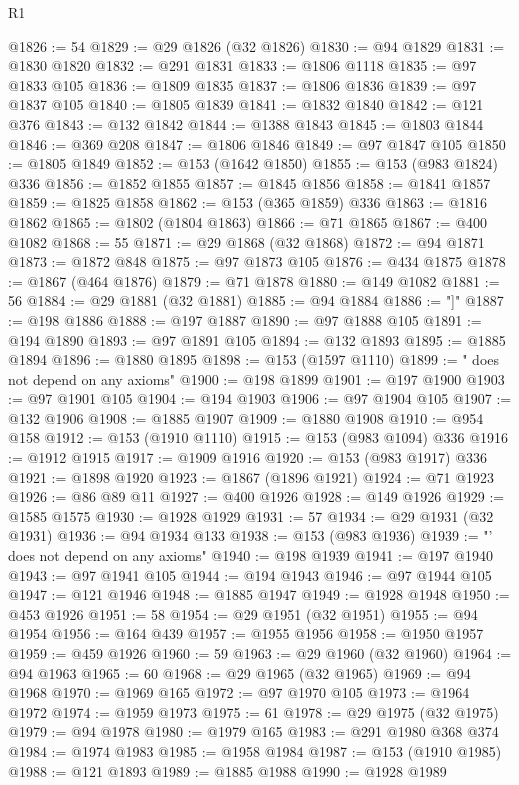 \begin{lexlean}{R1}
\begin{coremodule}
{{{{{{{{{{{{{{{{{{{{{{{{{{{{{{{{{{{{{{{{{{{{{{{{{{{{{{{{{{{{{{{{{{{{{{{{{{{{{{{{{{{{{{{{{{{{{{{{{{{{{{{{{{{{{{{{{{{{{{{{{{{{{{{{{{{{{{{{{{{{{{{{{{{{{{{{{{{{{{{{{{{{{{{{{{{{{{{{{{{{{{{{{{@1826 := 54
@1829 := @29 @1826 (@32 @1826)
@1830 := @94 @1829
@1831 := @1830 @1820
@1832 := @291 @1831
@1833 := @1806 @1118
@1835 := @97 @1833 @105
@1836 := @1809 @1835
@1837 := @1806 @1836
@1839 := @97 @1837 @105
@1840 := @1805 @1839
@1841 := @1832 @1840
@1842 := @121 @376
@1843 := @132 @1842
@1844 := @1388 @1843
@1845 := @1803 @1844
@1846 := @369 @208
@1847 := @1806 @1846
@1849 := @97 @1847 @105
@1850 := @1805 @1849
@1852 := @153 (@1642 @1850)
@1855 := @153 (@983 @1824) @336
@1856 := @1852 @1855
@1857 := @1845 @1856
@1858 := @1841 @1857
@1859 := @1825 @1858
@1862 := @153 (@365 @1859) @336
@1863 := @1816 @1862
@1865 := @1802 (@1804 @1863)
@1866 := @71 @1865
@1867 := @400 @1082
@1868 := 55
@1871 := @29 @1868 (@32 @1868)
@1872 := @94 @1871
@1873 := @1872 @848
@1875 := @97 @1873 @105
@1876 := @434 @1875
@1878 := @1867 (@464 @1876)
@1879 := @71 @1878
@1880 := @149 @1082
@1881 := 56
@1884 := @29 @1881 (@32 @1881)
@1885 := @94 @1884
@1886 := "]"
@1887 := @198 @1886
@1888 := @197 @1887
@1890 := @97 @1888 @105
@1891 := @194 @1890
@1893 := @97 @1891 @105
@1894 := @132 @1893
@1895 := @1885 @1894
@1896 := @1880 @1895
@1898 := @153 (@1597 @1110)
@1899 := " does not depend on any axioms"
@1900 := @198 @1899
@1901 := @197 @1900
@1903 := @97 @1901 @105
@1904 := @194 @1903
@1906 := @97 @1904 @105
@1907 := @132 @1906
@1908 := @1885 @1907
@1909 := @1880 @1908
@1910 := @954 @158
@1912 := @153 (@1910 @1110)
@1915 := @153 (@983 @1094) @336
@1916 := @1912 @1915
@1917 := @1909 @1916
@1920 := @153 (@983 @1917) @336
@1921 := @1898 @1920
@1923 := @1867 (@1896 @1921)
@1924 := @71 @1923
@1926 := @86 @89 @11
@1927 := @400 @1926
@1928 := @149 @1926
@1929 := @1585 @1575
@1930 := @1928 @1929
@1931 := 57
@1934 := @29 @1931 (@32 @1931)
@1936 := @94 @1934 @133
@1938 := @153 (@983 @1936)
@1939 := "' does not depend on any axioms"
@1940 := @198 @1939
@1941 := @197 @1940
@1943 := @97 @1941 @105
@1944 := @194 @1943
@1946 := @97 @1944 @105
@1947 := @121 @1946
@1948 := @1885 @1947
@1949 := @1928 @1948
@1950 := @453 @1926
@1951 := 58
@1954 := @29 @1951 (@32 @1951)
@1955 := @94 @1954
@1956 := @164 @439
@1957 := @1955 @1956
@1958 := @1950 @1957
@1959 := @459 @1926
@1960 := 59
@1963 := @29 @1960 (@32 @1960)
@1964 := @94 @1963
@1965 := 60
@1968 := @29 @1965 (@32 @1965)
@1969 := @94 @1968
@1970 := @1969 @165
@1972 := @97 @1970 @105
@1973 := @1964 @1972
@1974 := @1959 @1973
@1975 := 61
@1978 := @29 @1975 (@32 @1975)
@1979 := @94 @1978
@1980 := @1979 @165
@1983 := @291 @1980 @368 @374
@1984 := @1974 @1983
@1985 := @1958 @1984
@1987 := @153 (@1910 @1985)
@1988 := @121 @1893
@1989 := @1885 @1988
@1990 := @1928 @1989
}}}}}}}}}}}}}}}}}}}}}}}}}}}}}}}}}}}}}}}}}}}}}}}}}}}}}}}}}}}}}}}}}}}}}}}}}}}}}}}}}}}}}}}}}}}}}}}}}}}}}}}}}}}}}}}}}}}}}}}}}}}}}}}}}}}}}}}}}}}}}}}}}}}}}}}}}}}}}}}}}}}}}}}}}}}}}}}}}}}}}}}}}}
\end{coremodule}
\end{lexlean}
